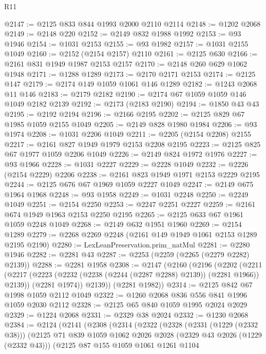 \begin{lexlean}{R11}
\begin{coremodule}
@2147 := @2125 @833 @844 @1993 @2000 @2110 @2114
@2148 := @1202 @2068
@2149 := @2148 @220
@2152 := @2149 @832 @1988 @1992
@2153 := @93 @1946
@2154 := @1031 @2153
@2155 := @93 @1982
@2157 := @1031 @2155 @1049
@2160 := @2152 (@2154 @2157) @2110
@2161 := @2125 @630
@2166 := @2161 @831 @1949 @1987 @2153 @2157
@2170 := @2148 @260 @629 @1062 @1948
@2171 := @1288 @1289
@2173 := @2170 @2171 @2153
@2174 := @2125 @147
@2179 := @2174 @149 @1059 @1061 @146 @1289
@2182 := @1243 @2068 @11 @146
@2183 := @2179 @2182
@2190 := @2174 @67 @1059 @1059 @146 @1049 @2182 @2139
@2192 := @2173 (@2183 @2190)
@2194 := @1850 @43 @43
@2195 := @2192 @2194
@2196 := @2166 @2195
@2202 := @2125 @829 @67 @1985 @1059 @2155 @1049
@2205 := @2149 @828 @1980 @1984
@2206 := @93 @1974
@2208 := @1031 @2206 @1049
@2211 := @2205 (@2154 @2208) @2155
@2217 := @2161 @827 @1949 @1979 @2153 @2208 @2195
@2223 := @2125 @825 @67 @1977 @1059 @2206 @1049
@2226 := @2149 @824 @1972 @1976
@2227 := @93 @1966
@2228 := @1031 @2227
@2229 := @2228 @1049
@2232 := @2226 (@2154 @2229) @2206
@2238 := @2161 @823 @1949 @1971 @2153 @2229 @2195
@2244 := @2125 @676 @67 @1969 @1059 @2227 @1049
@2247 := @2149 @675 @1964 @1968
@2248 := @93 @1958
@2249 := @1031 @2248
@2250 := @2249 @1049
@2251 := @2154 @2250
@2253 := @2247 @2251 @2227
@2259 := @2161 @674 @1949 @1963 @2153 @2250 @2195
@2265 := @2125 @633 @67 @1961 @1059 @2248 @1049
@2268 := @2149 @632 @1951 @1960
@2269 := @2154 @1289
@2279 := @2268 @2269 @2248 (@2161 @149 @1949 @1061 @2153 @1289 @2195 @2190)
@2280 := LexLeanPreservation.prim_natMul
@2281 := @2280 @1946
@2282 := @2281 @43
@2287 := @2253 (@2259 (@2265 (@2279 @2282) @2139))
@2288 := @2281 @1958
@2308 := @2147
    (@2160
      (@2196
        (@2202
          (@2211
            (@2217 (@2223 (@2232 (@2238 (@2244 (@2287 @2288) @2139)) (@2281 @1966)) @2139))
            (@2281 @1974))
          @2139))
      (@2281 @1982))
@2314 := @2125 @842 @67 @1998 @1059 @2112 @1049
@2322 := @1260 @2068 @836 @556 @841 @1996 @1059 @2030 @2112
@2328 := @2125 @65 @840 @1059 @1995 @2024 @2029
@2329 := @1224 @2068
@2331 := @2329 @38 @2024
@2332 := @1230 @2068
@2384 := @2124
    (@2141
      (@2308
        (@2314
          (@2322
            (@2328
              (@2331 (@1229 (@2332 @38)))
              (@2125
                @71
                @839
                @1059
                @1062
                @2026
                @2028
                (@2329 @43 @2026 (@1229 (@2332 @43)))
                (@2125
                  @87
                  @155
                  @1059
                  @1061
                  @1261
                  @1104

\end{coremodule}
\end{lexlean}
